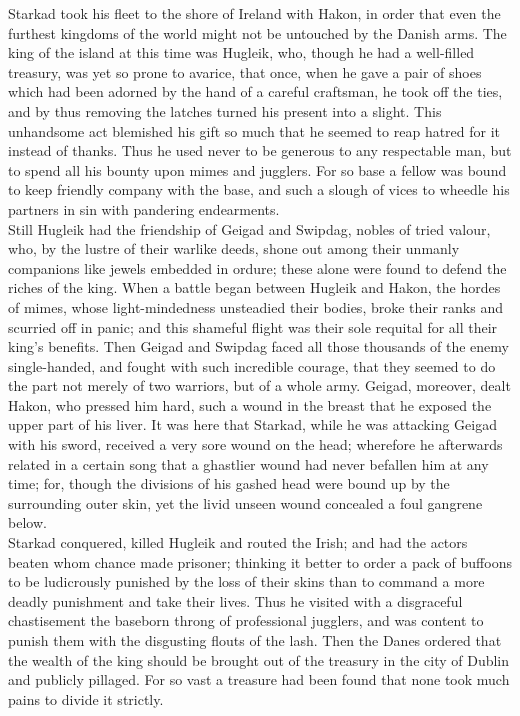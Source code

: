 \documentclass[10pt,a4paper]{report}
\begin{document}
Starkad took his fleet to the shore of Ireland with Hakon, in order that even the furthest kingdoms of the world might not be untouched by the Danish arms. The king of the island at this time was Hugleik, who, though he had a well-filled treasury, was yet so prone to avarice, that once, when he gave a pair of shoes which had been adorned by the hand of a careful craftsman, he took off the ties, and by thus removing the latches turned his present into a slight. This unhandsome act blemished his gift so much that he seemed to reap hatred for it instead of thanks. Thus he used never to be generous to any respectable man, but to spend all his bounty upon mimes and jugglers. For so base a fellow was bound to keep friendly company with the base, and such a slough of vices to wheedle his partners in sin with pandering endearments.\\

Still Hugleik had the friendship of Geigad and Swipdag, nobles of tried valour, who, by the lustre of their warlike deeds, shone out among their unmanly companions like jewels embedded in ordure; these alone were found to defend the riches of the king. When a battle began between Hugleik and Hakon, the hordes of mimes, whose light-mindedness unsteadied their bodies, broke their ranks and scurried off in panic; and this shameful flight was their sole requital for all their king's benefits. Then Geigad and Swipdag faced all those thousands of the enemy single-handed, and fought with such incredible courage, that they seemed to do the part not merely of two warriors, but of a whole army. Geigad, moreover, dealt Hakon, who pressed him hard, such a wound in the breast that he exposed the upper part of his liver. It was here that Starkad, while he was attacking Geigad with his sword, received a very sore wound on the head; wherefore he afterwards related in a certain song that a ghastlier wound had never befallen him at any time; for, though the divisions of his gashed head were bound up by the surrounding outer skin, yet the livid unseen wound concealed a foul gangrene below.\\

Starkad conquered, killed Hugleik and routed the Irish; and had the actors beaten whom chance made prisoner; thinking it better to order a pack of buffoons to be ludicrously punished by the loss of their skins than to command a more deadly punishment and take their lives. Thus he visited with a disgraceful chastisement the baseborn throng of professional jugglers, and was content to punish them with the disgusting flouts of the lash. Then the Danes ordered that the wealth of the king should be brought out of the treasury in the city of Dublin and publicly pillaged. For so vast a treasure had been found that none took much pains to divide it strictly.\\
\end{document}
